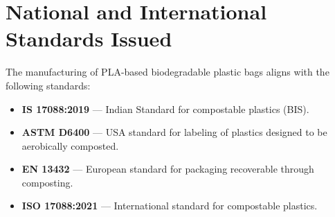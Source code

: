 \section*{National and International Standards Issued}
The manufacturing of PLA-based biodegradable plastic bags aligns with the following standards:
\begin{itemize}
    \item \textbf{IS 17088:2019} — Indian Standard for compostable plastics (BIS).
    \item \textbf{ASTM D6400} — USA standard for labeling of plastics designed to be aerobically composted.
    \item \textbf{EN 13432} — European standard for packaging recoverable through composting.
    \item \textbf{ISO 17088:2021} — International standard for compostable plastics.
\end{itemize}